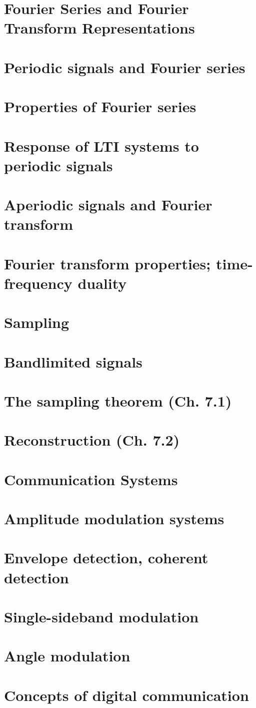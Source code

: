 \documentclass{article}
\begin{document}
\section*{Fourier Series and Fourier Transform Representations}
\section{Periodic signals and Fourier series}
\section{Properties of Fourier series}
\section{Response of LTI systems to periodic signals}
\section{Aperiodic signals and Fourier transform}
\section{Fourier transform properties; time-frequency duality}

\section*{Sampling}
\section{Bandlimited signals}
\section{The sampling theorem (Ch. 7.1)}
\section{Reconstruction (Ch. 7.2)}

\section*{Communication Systems}
\section{Amplitude modulation systems}
\section{Envelope detection, coherent detection}
\section{Single-sideband modulation}
\section{Angle modulation}
\section{Concepts of digital communication}
\end{document}
